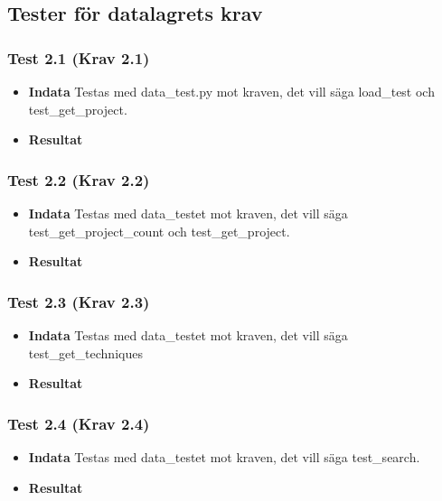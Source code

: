 \documentclass{TDP003mall}
\begin{document}
\subsection{Tester för datalagrets krav}
\subsubsection*{Test 2.1 (Krav 2.1)}
\begin{itemize}
\item[]\textbf{Indata} Testas med data\_test.py mot kraven, det vill säga load\_test och test\_get\_project.
\item[]\textbf{Resultat} 
\end{itemize}
\subsubsection*{Test 2.2 (Krav 2.2)}
\begin{itemize}
\item[]\textbf{Indata} Testas med data\_testet mot kraven, det vill säga test\_get\_project\_count och test\_get\_project.
\item[]\textbf{Resultat} 
\end{itemize}
\subsubsection*{Test 2.3 (Krav 2.3)}
\begin{itemize}
\item[]\textbf{Indata} Testas med data\_testet mot kraven, det vill säga test\_get\_techniques
\item[]\textbf{Resultat} 
\end{itemize}
\subsubsection*{Test 2.4 (Krav 2.4)}
\begin{itemize}
\item[]\textbf{Indata} Testas med data\_testet mot kraven, det vill säga test\_search.
\item[]\textbf{Resultat} 
\end{itemize}
\end{document}
